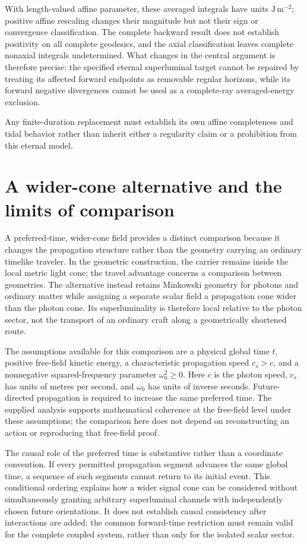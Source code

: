 \documentclass[11pt]{article}
\begin{document}
With length-valued affine parameter, these averaged integrals have units $\mathrm{J\,m^{-2}}$; positive affine rescaling changes their magnitude but not their sign or convergence classification. The complete backward result does not establish positivity on all complete geodesics, and the axial classification leaves complete nonaxial integrals undetermined. What changes in the central argument is therefore precise: the specified eternal superluminal target cannot be repaired by treating its affected forward endpoints as removable regular horizons, while its forward negative divergences cannot be used as a complete-ray averaged-energy exclusion.

Any finite-duration replacement must establish its own affine completeness and tidal behavior rather than inherit either a regularity claim or a prohibition from this eternal model.

\section{A wider-cone alternative and the limits of comparison}
A preferred-time, wider-cone field provides a distinct comparison because it changes the propagation structure rather than the geometry carrying an ordinary timelike traveler. In the geometric construction, the carrier remains inside the local metric light cone; the travel advantage concerns a comparison between geometries. The alternative instead retains Minkowski geometry for photons and ordinary matter while assigning a separate scalar field a propagation cone wider than the photon cone. Its superluminality is therefore local relative to the photon sector, not the transport of an ordinary craft along a geometrically shortened route.

The assumptions available for this comparison are a physical global time $t$, positive free-field kinetic energy, a characteristic propagation speed $c_s>c$, and a nonnegative squared-frequency parameter $\omega_0^2\geq 0$. Here $c$ is the photon speed, $c_s$ has units of metres per second, and $\omega_0$ has units of inverse seconds. Future-directed propagation is required to increase the same preferred time. The supplied analysis supports mathematical coherence at the free-field level under these assumptions; the comparison here does not depend on reconstructing an action or reproducing that free-field proof.

The causal role of the preferred time is substantive rather than a coordinate convention. If every permitted propagation segment advances the same global time, a sequence of such segments cannot return to its initial event. This conditional ordering explains how a wider signal cone can be considered without simultaneously granting arbitrary superluminal channels with independently chosen future orientations. It does not establish causal consistency after interactions are added: the common forward-time restriction must remain valid for the complete coupled system, rather than only for the isolated scalar sector.
\end{document}
